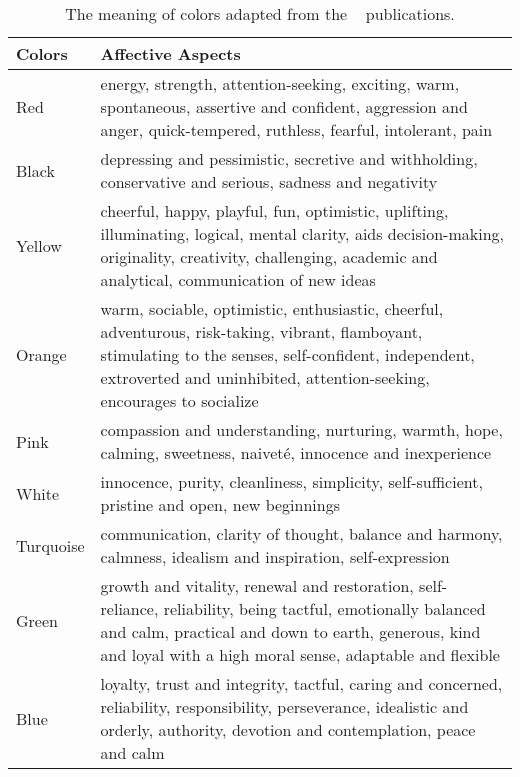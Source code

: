 \begin{table} [h]
    \centering
    \begin{tabular}{ | m{8em} | m{25em}| }
        \hline
        \textbf{Colors} & \textbf{Affective Aspects}  \\
        \hline
        Red & energy, strength, attention-seeking, exciting, warm, spontaneous, assertive and confident,
        aggression and anger, quick-tempered, ruthless, fearful, intolerant, pain  \\
        \hline
        Black & depressing and pessimistic, secretive and withholding, conservative and serious,
        sadness and negativity  \\
        \hline
        Yellow & cheerful, happy, playful, fun, optimistic, uplifting, illuminating, logical, mental clarity,
        aids decision-making, originality, creativity, challenging, academic and analytical, communication of new ideas   \\
        \hline
        Orange & warm, sociable, optimistic, enthusiastic, cheerful, adventurous, risk-taking, vibrant,
        flamboyant, stimulating to the senses, self-confident, independent, extroverted and uninhibited,
        attention-seeking, encourages to socialize  \\
        \hline
        Pink & compassion and understanding, nurturing, warmth, hope, calming, sweetness,
        naiveté, innocence and inexperience  \\
        \hline
        White & innocence, purity, cleanliness, simplicity, self-sufficient, pristine and open, new beginnings  \\
        \hline
        Turquoise & communication, clarity of thought, balance and harmony, calmness,
        idealism and inspiration, self-expression \\
        \hline
        Green & growth and vitality, renewal and restoration, self-reliance, reliability,
        being tactful, emotionally balanced and calm, practical and down to earth, generous, kind and loyal
        with a high moral sense, adaptable and flexible  \\
        \hline
        Blue & loyalty, trust and integrity, tactful, caring and concerned, reliability, responsibility,
        perseverance, idealistic and orderly, authority, devotion and contemplation, peace and calm \\
        \hline
    \end{tabular}
    \caption{The meaning of colors adapted from the ~\cite{luscher1971luscher,cerrato2012meaning, alschuler1943easel,schaie1961scaling} publications.}
    \label{table:color}
\end{table}

